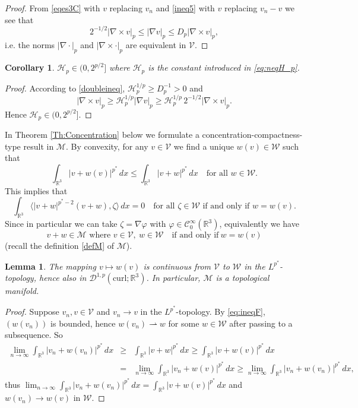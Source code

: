 \documentclass[12pt,leqno,twoside]{amsart}
\newtheorem{Lem}[Th]{Lemma}
\newtheorem{Cor}[Th]{Corollary}
\newcommand{\vp}{\varphi}
\def\R{\mathbb{R}}
\def\curl{\mathrm{curl}}
\def\Wc{\mathscr{W}}
\def\rh{\rightharpoonup}
\newcommand{\cC}{{\mathcal C}}
\newcommand{\cD}{{\mathcal D}}
\newcommand{\cH}{{\mathcal H}}
\newcommand{\cM}{{\mathcal M}}
\newcommand{\cV}{{\mathcal V}}
\newcommand{\cW}{{\mathcal W}}
\def\r{\mathbb{R}}
\def\r3{\mathbb{R}^3}
\def\Wc{\cD^{1,p}(\curl;\R^3)}
\def\rh{\rightharpoonup}
\def\ir3{\int_{\r3}}
\def\vp{\varphi}
\def\curlop{\nabla\times}
\numberwithin{equation}{section}
\begin{document}
\begin{proof}
From \eqref{eqes3C} with $v$ replacing $v_n$ and \eqref{ineq5} with $v$ replacing $v_n-v$ we see that
\begin{equation} \label{doubleineq}
2^{-1/2}|\curlop v|_p \le  |\nabla v|_p\leq D_p |\curlop v|_p,
\end{equation}
i.e. the norms $|\nabla\cdot|_p$ and $|\curlop\cdot|_p$ are equivalent in $\cV$.
\end{proof}

\begin{Cor} \label{corhp}
$\cH_p\in(0,2^{p/2}]$ where $\cH_p$ is the constant introduced in \eqref{eq:neqH_p}.
\end{Cor}

\begin{proof}
According to \eqref{doubleineq}, $\cH_p^{1/p} \ge D_p^{-1}>0$ and
\[
|\curlop v|_p \ge \cH_p^{1/p}|\nabla v|_p \ge \cH_p^{1/p}\,2^{-1/2}|\curlop v|_p.
\]
Hence $\cH_p\in(0,2^{p/2}]$.
\end{proof}




In Theorem \ref{Th:Concentration} below we formulate a concentration-compactness-type result in $\cM$.
By convexity, for any $v\in\cV$ we find a unique $w(v)\in \cW$ such that
\begin{equation}\label{eq:ineqF}
	\int_{\R^3}|v+w(v)|^{p^*}\,dx \le \int_{\R^3}|v+ w|^{p^*}\,dx \quad \text{for all } w\in \cW.
\end{equation}
This implies that
\begin{equation} \label{eq:eqf}
	\int_{\R^3}\langle |v+w|^{p^*-2}(v+w),\zeta\rangle\,dx  =0 \quad \text{for all } \zeta\in\cW \text{ if and only if }  w=w(v).
\end{equation}
Since in particular we can take $\zeta = \nabla\vp$ with $\vp\in \cC_0^\infty(\r3)$, equivalently we have 
\begin{equation} \label{eq:eqf1}
v+w\in\cM \text{ where } v\in\cV,\ w\in\cW \quad  \text{if and only if} \ w=w(v)
\end{equation}
(recall the definition \eqref{defM} of $\cM$).

\begin{Lem} \label{convw}
The mapping $v\mapsto w(v)$ is continuous from $\cV$ to $\cW$ in the $L^{p^*}$-topology, hence also in $\Wc$. In particular, $\cM$ is a topological manifold.
\end{Lem}

\begin{proof}
Suppose $v_n,v\in \cV$ and $v_n\to v$ in the $L^{p^*}$-topology. By \eqref{eq:ineqF}, $(w(v_n))$ is bounded, hence $w(v_n)\rh w$ for some $w\in\cW$ after passing to a subsequence. So
\begin{eqnarray*}
\lim_{n\to\infty}\ir3|v_n+w(v_n)|^{p^*}\,dx & \ge & \ir3|v+w|^{p^*}\,dx \ge \ir3|v+w(v)|^{p^*}\,dx \\
& = &  \lim_{n\to\infty}\ir3|v_n+w(v)|^{p^*}\,dx \ge \lim_{n\to\infty}\ir3|v_n+w(v_n)|^{p^*}\,dx,
\end{eqnarray*}
 thus $\lim_{n\to\infty}\ir3|v_n+w(v_n)|^{p^*}\,dx = \ir3|v+w(v)|^{p^*}\,dx$ and $w(v_n)\to w(v)$ in $\cW$.
\end{proof}
\end{document}
